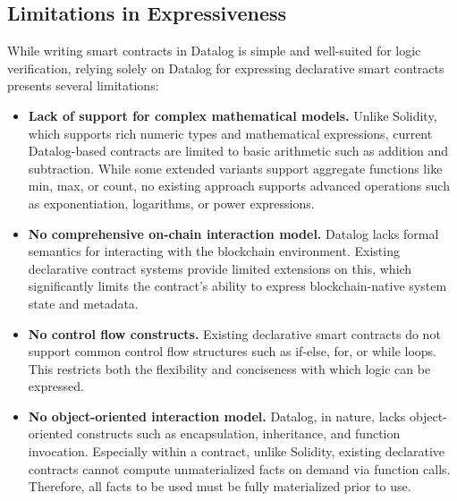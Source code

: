 \subsection{Limitations in Expressiveness}
\label{ssec-limitation}
While writing smart contracts in Datalog is simple and well-suited for logic verification, relying solely on Datalog for expressing declarative smart contracts presents several limitations:
\begin{itemize}[leftmargin=10pt]

    \item \textbf{Lack of support for complex mathematical models. }
Unlike Solidity, which supports rich numeric types and mathematical expressions, current Datalog-based contracts are limited to basic arithmetic such as addition and subtraction. While some extended variants support aggregate functions like min, max, or count, no existing approach supports advanced operations such as exponentiation, logarithms, or power expressions.

    \item \textbf{No comprehensive on-chain interaction model. }
Datalog lacks formal semantics for interacting with the blockchain environment. Existing declarative contract systems provide limited extensions on this,
which significantly limits the contract's ability to express blockchain-native system state and metadata.

    \item \textbf{No control flow constructs. }
Existing declarative smart contracts do not support common control flow structures such as {\sf if-else}, {\sf for}, or {\sf while} loops. This restricts both the flexibility and conciseness with which logic can be expressed.

    \item \textbf{No object-oriented interaction model. }
Datalog, in nature, lacks object-oriented constructs such as encapsulation, inheritance, and function invocation. 
Especially within a contract, unlike Solidity, existing declarative contracts cannot compute unmaterialized facts on demand via function calls. Therefore, all facts to be used must be fully materialized prior to use. 

\end{itemize}

